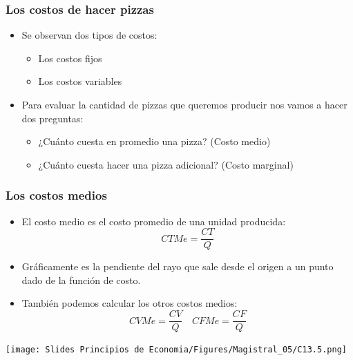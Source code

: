 \documentclass{beamer}
\begin{document}
\begin{frame}
\frametitle{Los costos de hacer pizzas}
\begin{itemize}
    \item Se observan dos tipos de costos: 
        \begin{itemize}
        \item Los costos fijos
        \item Los costos variables
        \end{itemize}
    \vspace{2mm}
    \item Para evaluar la cantidad de pizzas que queremos producir nos vamos a hacer dos preguntas:
        \begin{itemize}
        \item ¿Cuánto cuesta en promedio una pizza? (Costo medio)
        \item ¿Cuánto cuesta hacer una pizza adicional? (Costo marginal)
        \end{itemize}
\end{itemize}
\end{frame}

\begin{frame}
\frametitle{Los costos medios}
    \begin{minipage}{0.45\textwidth}
            \begin{itemize}
            \item El costo medio es el costo promedio de una unidad producida:
                \[ CTMe = \frac{CT}{Q} \]
            \item Gráficamente es la pendiente del rayo que sale desde el origen a un punto dado de la función de costo. 
            \item También podemos calcular los otros costos medios:
            \[
            CVMe = \frac{CV}{Q} \quad CFMe = \frac{CF}{Q}
            \]
            \end{itemize}
    \end{minipage}
    \hfill
    \begin{minipage}{0.4\textwidth}
    \texttt{[image: Slides Principios de Economia/Figures/Magistral\_05/C13.5.png]}
    \end{minipage}
 \end{frame}
\end{document}
